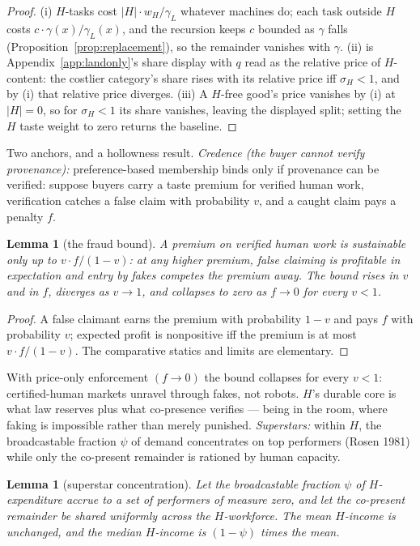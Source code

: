 \documentclass[12pt]{article}
\theoremstyle{plain}
\newtheorem{lemma}[proposition]{Lemma}
\begin{document}
\begin{proof}
(i) $H$-tasks cost $|H|\cdot w_H/\gamma _L$ whatever machines do; each task outside $H$ costs $c\cdot \gamma (x)/\gamma _L(x)$, and the recursion keeps $c$ bounded as $\gamma$ falls (Proposition~\ref{prop:replacement}), so the remainder vanishes with $\gamma$. (ii) is Appendix~\ref{app:landonly}'s share display with $q$ read as the relative price of $H$-content: the costlier category's share rises with its relative price iff $\sigma _H < 1$, and by (i) that relative price diverges. (iii) A $H$-free good's price vanishes by (i) at $|H| = 0$, so for $\sigma _H < 1$ its share vanishes, leaving the displayed split; setting the $H$ taste weight to zero returns the baseline.
\end{proof}

Two anchors, and a hollowness result. \emph{Credence (the buyer cannot verify provenance):} preference-based membership binds only if provenance can be verified: suppose buyers carry a taste premium for verified human work, verification catches a false claim with probability $v$, and a caught claim pays a penalty $f$.

\begin{lemma}[the fraud bound]\label{lem:fraud}
A premium on verified human work is sustainable only up to $v\cdot f/(1-v)$: at any higher premium, false claiming is profitable in expectation and entry by fakes competes the premium away. The bound rises in $v$ and in $f$, diverges as $v \to 1$, and collapses to zero as $f \to 0$ for every $v < 1$.
\end{lemma}

\begin{proof}
A false claimant earns the premium with probability $1 - v$ and pays $f$ with probability $v$; expected profit is nonpositive iff the premium is at most $v\cdot f/(1-v)$. The comparative statics and limits are elementary.
\end{proof}

With price-only enforcement $(f \to 0)$ the bound collapses for every $v < 1$: certified-human markets unravel through fakes, not robots. $H$'s durable core is what law reserves plus what co-presence verifies --- being in the room, where faking is impossible rather than merely punished. \emph{Superstars:} within $H$, the broadcastable fraction $\psi$ of demand concentrates on top performers (Rosen 1981) while only the co-present remainder is rationed by human capacity.

\begin{lemma}[superstar concentration]\label{lem:superstar}
Let the broadcastable fraction $\psi$ of $H$-expenditure accrue to a set of performers of measure zero, and let the co-present remainder be shared uniformly across the $H$-workforce. The mean $H$-income is unchanged, and the median $H$-income is $(1-\psi )$ times the mean.
\end{lemma}
\end{document}
